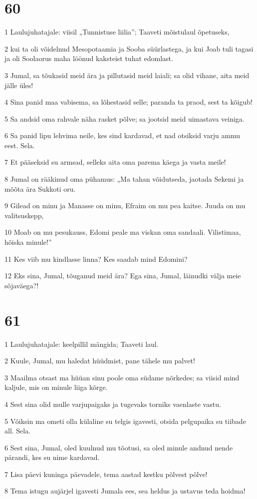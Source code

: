 \chapter{60}

\par 1 Laulujuhatajale: viisil „Tunnistuse liilia”; Taaveti mõistulaul õpetuseks,
\par 2 kui ta oli võidelnud Mesopotaamia ja Sooba süürlastega, ja kui Joab tuli tagasi ja oli Soolaorus maha löönud kaksteist tuhat edomlast.
\par 3 Jumal, sa tõukasid meid ära ja pillutasid meid laiali; sa olid vihane, aita meid jälle üles!
\par 4 Sina panid maa vabisema, sa lõhestasid selle; paranda ta praod, sest ta kõigub!
\par 5 Sa andsid oma rahvale näha rasket põlve; sa jootsid meid uimastava veiniga.
\par 6 Sa panid lipu lehvima neile, kes sind kardavad, et nad otsiksid varju ammu eest. Sela.
\par 7 Et pääseksid su armsad, selleks aita oma parema käega ja vasta meile!
\par 8 Jumal on rääkinud oma pühamus: „Ma tahan võidutseda, jaotada Sekemi ja mõõta ära Sukkoti oru.
\par 9 Gilead on minu ja Manasse on minu, Efraim on mu pea kaitse. Juuda on mu valitsuskepp,
\par 10 Moab on mu pesukauss, Edomi peale ma viskan oma sandaali. Vilistimaa, hõiska minule!”
\par 11 Kes viib mu kindlasse linna? Kes saadab mind Edomini?
\par 12 Eks sina, Jumal, tõuganud meid ära? Ega sina, Jumal, läinudki välja meie sõjaväega?!

\chapter{61}

\par 1 Laulujuhatajale: keelpillil mängida; Taaveti laul.
\par 2 Kuule, Jumal, mu haledat hüüdmist, pane tähele mu palvet!
\par 3 Maailma otsast ma hüüan sinu poole oma südame nõrkedes; sa viisid mind kaljule, mis on minule liiga kõrge.
\par 4 Sest sina olid mulle varjupaigaks ja tugevaks torniks vaenlaste vastu.
\par 5 Võiksin ma ometi olla külaline su telgis igavesti, otsida pelgupaika su tiibade all. Sela.
\par 6 Sest sina, Jumal, oled kuulnud mu tõotusi, sa oled minule andnud nende pärandi, kes su nime kardavad.
\par 7 Lisa päevi kuninga päevadele, tema aastad kestku põlvest põlve!
\par 8 Tema istugu aujärjel igavesti Jumala ees, sea heldus ja ustavus teda hoidma!

